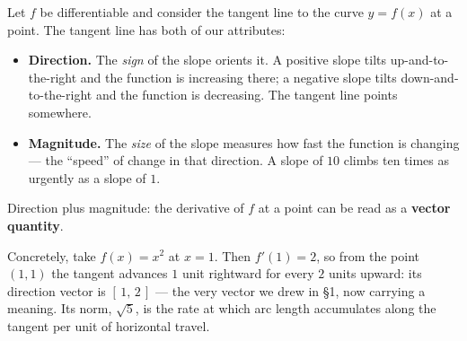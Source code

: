 \documentclass[11pt]{article}
\theoremstyle{definition}
\theoremstyle{remark}
\begin{document}
Let $f$ be differentiable and consider the tangent line to the curve $y=f(x)$ at
a point. The tangent line has both of our attributes:

\begin{itemize}[leftmargin=1.4em,itemsep=3pt]
  \item \textbf{Direction.} The \emph{sign} of the slope orients it. A positive
        slope tilts up-and-to-the-right and the function is increasing there; a
        negative slope tilts down-and-to-the-right and the function is
        decreasing. The tangent line points somewhere.
  \item \textbf{Magnitude.} The \emph{size} of the slope measures how fast the
        function is changing --- the ``speed'' of change in that direction. A
        slope of $10$ climbs ten times as urgently as a slope of $1$.
\end{itemize}

\noindent Direction plus magnitude: the derivative of $f$ at a point can be read
as a \textbf{vector quantity}.

Concretely, take $f(x)=x^{2}$ at $x=1$. Then $f'(1)=2$, so from the point
$(1,1)$ the tangent advances $1$ unit rightward for every $2$ units upward: its
direction vector is $[\,1,\,2\,]$ --- the very vector we drew in \S1, now
carrying a meaning. Its norm, $\sqrt{5}$, is the rate at which arc length
accumulates along the tangent per unit of horizontal travel.

\begin{center}
\end{center}

\end{document}
